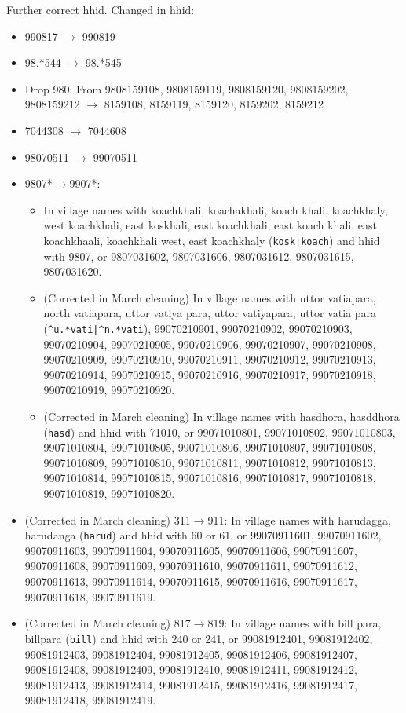 Further correct \textsf{hhid}. Changed in \textsf{hhid}: 
\begin{itemize}
\vspace{1.0ex}\setlength{\itemsep}{1.0ex}\setlength{\baselineskip}{12pt}
\item	990817 $\rightarrow$ 990819
\item	98.*544 $\rightarrow$ 98.*545
\item	Drop 980: From %
9808159108, %
9808159119, 9808159120, 
9808159202, 9808159212 $\rightarrow$
8159108, 8159119, 8159120, 8159202, 8159212 
\item	7044308 $\rightarrow$ 7044608
\item	98070511 $\rightarrow$ 99070511
\item	9807*$\rightarrow$9907*: 
	\begin{itemize}
	\vspace{1.0ex}\setlength{\itemsep}{1.0ex}\setlength{\baselineskip}{12pt}
	\item	In village names with {\footnotesize koachkhali, koachakhali, koach khali, koachkhaly, west koachkhali, east koskhali, east koachkhali, east koach khali, east koachkhaali, koachkhali west, east koachkhaly} (\verb+kosk|koach+) and \textsf{hhid} with 9807, or {9807031602, 9807031606, 9807031612, 9807031615, 9807031620}.
	\item	\scriptsize (Corrected in March cleaning) In village names with {\footnotesize uttor vatiapara, north vatiapara, uttor vatiya para, uttor vatiyapara, uttor vatia para} (\verb+^u.*vati|^n.*vati+), {99070210901, 99070210902, 99070210903, 99070210904, 99070210905, 99070210906, 99070210907, 99070210908, 99070210909, 99070210910, 99070210911, 99070210912, 99070210913, 99070210914, 99070210915, 99070210916, 99070210917, 99070210918, 99070210919, 99070210920}.
	\item	\scriptsize (Corrected in March cleaning) In village names with {\footnotesize hasdhora, hasddhora}  (\verb+hasd+) and \textsf{hhid} with 71010, or 99071010801, 99071010802, 99071010803, 99071010804, 99071010805, 99071010806, 99071010807, 99071010808, 99071010809, 99071010810, 99071010811, 99071010812, 99071010813, 99071010814, 99071010815, 99071010816, 99071010817, 99071010818, 99071010819, 99071010820.
	\end{itemize}
\item	\scriptsize (Corrected in March cleaning) 311$\rightarrow$911: In village names with {\footnotesize harudagga, harudanga} (\verb+harud+) and \textsf{hhid} with 60 or 61, or 99070911601, 99070911602, 99070911603, 99070911604, 99070911605, 99070911606, 99070911607, 99070911608, 99070911609, 99070911610, 99070911611, 99070911612, 99070911613, 99070911614, 99070911615, 99070911616, 99070911617, 99070911618, 99070911619.
\item	\scriptsize (Corrected in March cleaning) 817$\rightarrow$819: In village names with {\footnotesize bill para, billpara} (\verb+bill+) and \textsf{hhid} with  240 or 241, or 99081912401, 99081912402, 99081912403, 99081912404, 99081912405, 99081912406, 99081912407, 99081912408, 99081912409, 99081912410, 99081912411, 99081912412, 99081912413, 99081912414, 99081912415, 99081912416, 99081912417, 99081912418, 99081912419.
\end{itemize}

